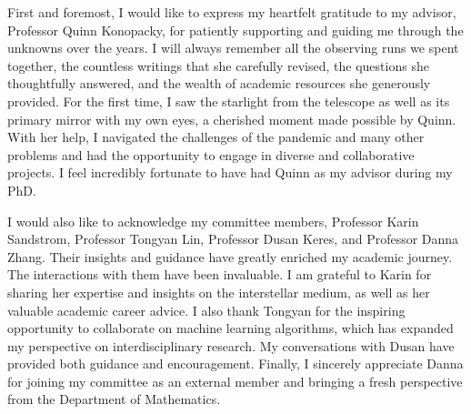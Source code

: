 \documentclass[12pt]{ucsddissertation}
\begin{document}
\begin{CJK*}{UTF8}{gbsn}
\begin{epigraph}

\end{epigraph}

\tableofcontents
\listoffigures
\listoftables


\begin{acknowledgements}

First and foremost, I would like to express my heartfelt gratitude to my advisor, Professor Quinn Konopacky, for patiently supporting and guiding me through the unknowns over the years. I will always remember all the observing runs we spent together, the countless writings that she carefully revised, the questions she thoughtfully answered, and the wealth of academic resources she generously provided. For the first time, I saw the starlight from the telescope as well as its primary mirror with my own eyes, a cherished moment made possible by Quinn. With her help, I navigated the challenges of the pandemic and many other problems and had the opportunity to engage in diverse and collaborative projects. I feel incredibly fortunate to have had Quinn as my advisor during my PhD.

I would also like to acknowledge my committee members, Professor Karin Sandstrom, Professor Tongyan Lin, Professor Dusan Keres, and Professor Danna Zhang. Their insights and guidance have greatly enriched my academic journey. The interactions with them have been invaluable. I am grateful to Karin for sharing her expertise and insights on the interstellar medium, as well as her valuable academic career advice. I also thank Tongyan for the inspiring opportunity to collaborate on machine learning algorithms, which has expanded my perspective on interdisciplinary research. My conversations with Dusan have provided both guidance and encouragement. Finally, I sincerely appreciate Danna for joining my committee as an external member and bringing a fresh perspective from the Department of Mathematics.


\end{acknowledgements}
\end{CJK*}
\end{document}

